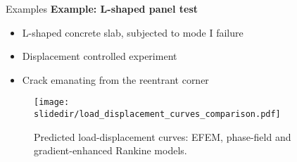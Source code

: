 
\begin{frame}{Examples}
    \textbf{Example: L-shaped panel test}
\begin{minipage}{1.0\textwidth}
\begin{minipage}{0.5\textwidth}
    \begin{itemize}
        \item L-shaped concrete slab, subjected to mode I failure
        \item Displacement controlled experiment
        \item Crack emanating from the reentrant corner
    \end{itemize}
\end{minipage}%
\end{minipage}

\vfill

\begin{minipage}{1.0\textwidth}
    \begin{figure}[htpb]
        \centering
        \texttt{[image: \\slidedir/load\_displacement\_curves\_comparison.pdf]}
        \caption{Predicted load-displacement curves: EFEM, phase-field and gradient-enhanced Rankine models.}%
    \end{figure}
\end{minipage}
\end{frame}
